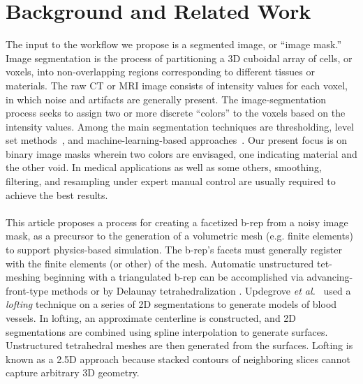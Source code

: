\section{Background and Related Work}

The input to the workflow we propose is a segmented image, or ``image mask.''
Image segmentation is the process of partitioning a 3D cuboidal array of cells, or voxels, into non-overlapping regions corresponding to different tissues or materials.  The raw CT or MRI image consists of intensity values for each voxel, in which noise and artifacts are generally present.  The image-segmentation process seeks to assign two or more discrete ``colors'' to the voxels based on the intensity values.  Among the main segmentation techniques are thresholding, level set methods~\cite{malladi_1995, sethian_1996}, and machine-learning-based approaches~\cite{litjens_2017}.  Our present focus is on binary image masks wherein two colors are envisaged, one indicating material and the other void.  In medical applications as well as some others, smoothing, filtering, and resampling under expert manual control are usually required to achieve the best results. \\ \\ 
%
This article proposes a process for creating a facetized b-rep from a noisy image mask, as a precursor to the generation of a volumetric mesh (e.g. finite elements) to support physics-based simulation.  The b-rep's facets must generally register with the finite elements (or other) of the mesh.  Automatic unstructured tet-meshing beginning with a triangulated b-rep can be accomplished via advancing-front-type methods \cite{jin_1993, lohner_1988} or by Delaunay tetrahedralization \cite{lohner_1997}. Updegrove \textit{et al.}~\cite{updegrove_2016} used a \textit{lofting} technique on a series of 2D segmentations to generate models of blood vessels. In lofting, an approximate centerline is constructed, and 2D segmentations are combined using spline interpolation to generate surfaces. Unstructured tetrahedral meshes are then generated from the surfaces. Lofting is known as a 2.5D approach because stacked contours of neighboring slices cannot capture arbitrary 3D geometry. \\ \\
%
